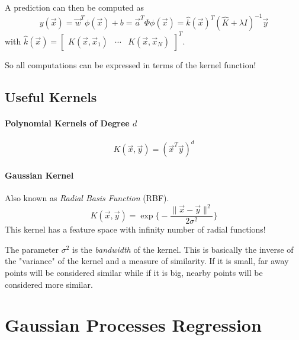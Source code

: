 			A prediction can then be computed as
			\begin{equation}
				y(\vec{x}) = \vec{w}^T \phi(\vec{x}) + b = \vec{a}^T \Phi \phi(\vec{x}) = \hat{k}(\vec{x})^T (\hat{K} + \lambda I)^{-1} \vec{y}
			\end{equation}
			with \( \hat{k}(\vec{x}) = \begin{bmatrix} K(\vec{x}, \vec{x}_1) & \cdots & K(\vec{x}, \vec{x}_N) \end{bmatrix}^T \).

			So all computations can be expressed in terms of the kernel function!

		\subsection{Useful Kernels}
			\paragraph{Polynomial Kernels of Degree \(d\)}
				\begin{equation}
					K(\vec{x}, \vec{y}) = (\vec{x}^T \vec{y})^d
				\end{equation}

			\paragraph{Gaussian Kernel}
				Also known as \emph{Radial Basis Function} (RBF).
				\begin{equation}
					K(\vec{x}, \vec{y}) = \exp \Bigg\{ -\frac{\lVert \vec{x} - \vec{y} \rVert^2}{2\sigma^2} \Bigg\}
				\end{equation}
				This kernel has a feature space with infinity number of radial functions!

				The parameter \( \sigma^2 \) is the \emph{bandwidth} of the kernel. This is basically the inverse of the "variance" of the kernel and a measure of similarity. If it is small, far away points will be considered similar while if it is big, nearby points will be considered more similar.

	\section{Gaussian Processes Regression}
		\label{sec:gaussianProcesses}


